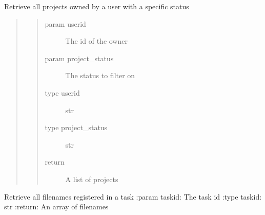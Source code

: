 \documentclass[letterpaper,10pt,english]{sphinxmanual}
\begin{document}
\begin{fulllineitems}
\label{\detokenize{index:models.project.get_projects_by_status_and_owner}}
Retrieve all projects owned by a user with a specific status
\begin{quote}
\begin{quote}\begin{description}
\item[{param userid}] \leavevmode
The id of the owner

\item[{param project\_status}] \leavevmode
The status to filter on

\item[{type userid}] \leavevmode
str

\item[{type project\_status}] \leavevmode
str

\item[{return}] \leavevmode
A list of projects

\end{description}\end{quote}
\end{quote}

\end{fulllineitems}


\begin{fulllineitems}
\label{\detokenize{index:models.project.get_task_files}}
Retrieve all filenames registered in a task
:param taskid: The task id
:type taskid: str
:return: An array of filenames

\end{fulllineitems}

\end{document}
